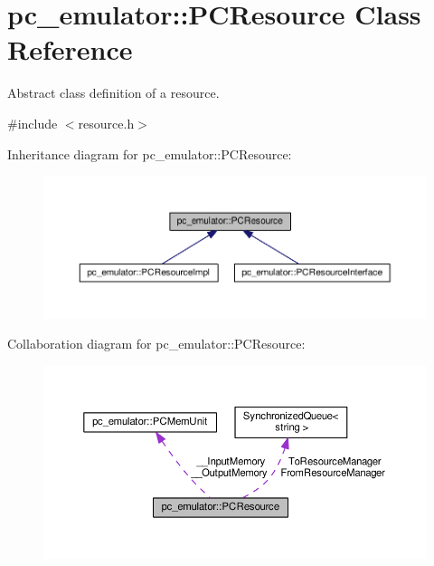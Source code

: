 \hypertarget{classpc__emulator_1_1PCResource}{}\section{pc\+\_\+emulator\+:\+:P\+C\+Resource Class Reference}
\label{classpc__emulator_1_1PCResource}


Abstract class definition of a resource.  




{\ttfamily \#include $<$resource.\+h$>$}



Inheritance diagram for pc\+\_\+emulator\+:\+:P\+C\+Resource\+:\nopagebreak
\begin{figure}[H]
\begin{center}
\leavevmode
\includegraphics[width=350pt]{classpc__emulator_1_1PCResource__inherit__graph}
\end{center}
\end{figure}


Collaboration diagram for pc\+\_\+emulator\+:\+:P\+C\+Resource\+:\nopagebreak
\begin{figure}[H]
\begin{center}
\leavevmode
\includegraphics[width=350pt]{classpc__emulator_1_1PCResource__coll__graph}
\end{center}
\end{figure}
